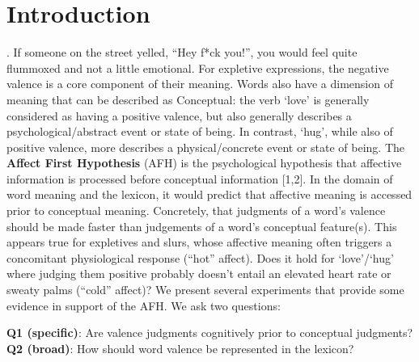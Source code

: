 \section{Introduction}. 
If someone on the street yelled, ``Hey f*ck you!'', you would feel quite flummoxed and not a little emotional. For expletive expressions, the negative valence is a core component of their meaning. Words also have a dimension of meaning that can be described as Conceptual: the verb `love' is generally considered as having a positive valence, but also generally describes a psychological/abstract event or state of being. In contrast, `hug', while also of positive valence, more describes a physical/concrete event or state of being. The \textbf{Affect First Hypothesis} (AFH) is the psychological hypothesis that affective information is processed before conceptual information [1,2]. In the domain of word meaning and the lexicon, it would predict that affective meaning is accessed prior to conceptual meaning. Concretely, that judgments of a word's valence should be made faster than judgements of a word's conceptual feature(s). This appears true for expletives and slurs, whose affective meaning often triggers a concomitant physiological response (``hot'' affect). Does it hold for `love'/`hug' where judging them positive probably doesn't entail an elevated heart rate or sweaty palms (``cold'' affect)? We present several experiments that provide some evidence in support of the AFH. We ask two questions:


\begin{tcolorbox}[colback=white]
\centering
\textbf{Q1 (specific)}: Are valence judgments cognitively prior to conceptual judgments? \\ 
\textbf{Q2 (broad)}: How should word valence be represented in the lexicon?
\end{tcolorbox}

